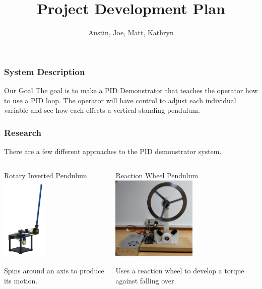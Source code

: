 \documentclass[aspectratio=169]{beamer}
\title{Project Development Plan}       %
\author{Austin, Joe, Matt, Kathryn}                     %
\institute{SNHU/CETA}                                   %
\begin{document}
\frame{\titlepage} %


\begin{frame}
    \frametitle{System Description}

    \begin{block}{Our Goal}
        The goal is to make a PID Demonstrator that teaches the operator how to use a PID loop.
        The operator will have control to adjust each individual variable and see how each effects a
        vertical standing pendulum.
    \end{block}
\end{frame}

\begin{frame}
    \frametitle{Research}

    There are a few different approaches to the PID demonstrator system.

    \begin{columns}

    \begin{column}{0.48\textwidth}
        \begin{block}{Rotary Inverted Pendulum}
             \includegraphics[height=4cm]{RotaryInvertedPendulum}
        \end{block}
        Spins around an axis to produce its motion.
    \end{column}

    \begin{column}{0.48\textwidth}
        \begin{block}{Reaction Wheel Pendulum}
                \includegraphics[height=4cm]{ReactionWheel}
        \end{block}
        Uses a reaction wheel to develop a torque against falling over.
    \end{column}
\end{columns}
\end{frame}
\end{document}
